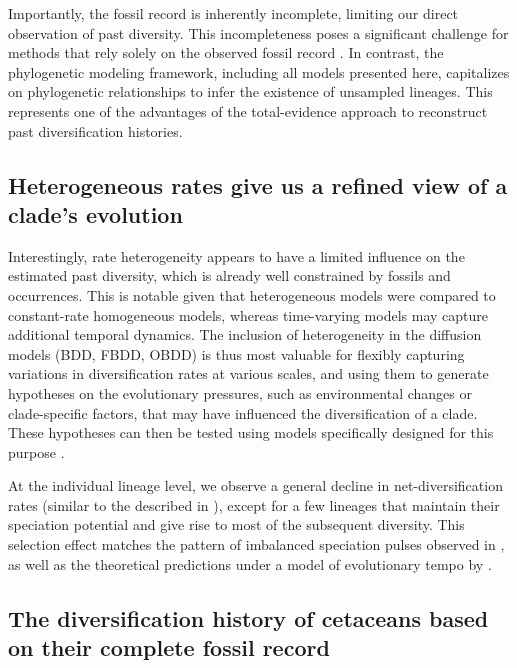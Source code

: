 \documentclass[oupdraft]{sysbio}
\begin{document}
Importantly, the fossil record is inherently incomplete, limiting our direct observation of past diversity. This incompleteness poses a significant challenge for methods that rely solely on the observed fossil record \citep{silvestro_bayesian_2014}. In contrast, the phylogenetic modeling framework, including all models presented here, capitalizes on phylogenetic relationships to infer the existence of unsampled lineages. This represents one of the advantages of the total-evidence approach to reconstruct past diversification histories.

\subsection{Heterogeneous rates give us a refined view of a clade's evolution}

Interestingly, rate heterogeneity appears to have a limited influence on the estimated past diversity, which is already well constrained by fossils and occurrences. This is notable given that heterogeneous models were compared to constant-rate homogeneous models, whereas time-varying models may capture additional temporal dynamics. The inclusion of heterogeneity in the diffusion models (BDD, FBDD, OBDD) is thus most valuable for flexibly capturing variations in diversification rates at various scales, and using them to generate hypotheses on the evolutionary pressures, such as environmental changes or clade-specific factors, that may have influenced the diversification of a clade. These hypotheses can then be tested using models specifically designed for this purpose \citep{morlon_phylogenetic_2024}.

At the individual lineage level, we observe a general decline in net-diversification rates (similar to the  described in \citet{quintero_rise_2025}), except for a few lineages that maintain their speciation potential and give rise to most of the subsequent diversity. This selection effect matches the pattern of imbalanced speciation pulses observed in \citet{quintero_imbalanced_2024}, as well as the theoretical predictions under a model of evolutionary tempo by \citet{budd_evolutionary_2025}.

\subsection{The diversification history of cetaceans based on their complete fossil record}
\end{document}
